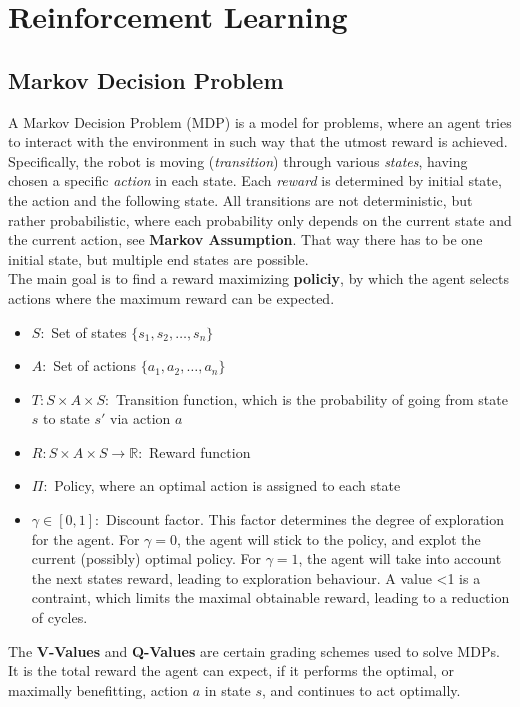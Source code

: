 \documentclass[a4paper]{article}
\begin{document}
	\section{Reinforcement Learning}

	\subsection{Markov Decision Problem}
	A Markov Decision Problem (MDP) is a model for problems, where an agent tries to interact with the environment in such way that the utmost reward is achieved. Specifically, the robot is moving (\textit{transition}) through various \textit{states}, having chosen a specific \textit{action} in each state. Each \textit{reward} is determined by initial state, the action and the following state. 
	All transitions are not deterministic, but rather probabilistic, where each probability only depends on the current state and the current action, see \textbf{Markov Assumption}. That way there has to be one initial state, but multiple end states are possible.\\
	The main goal is to find a reward maximizing \textbf{policiy}, by which the agent selects actions where the maximum reward can be expected.\\
	\begin{itemize}
		\item $S:$ Set of states $\{s_1,s_2,\dots, s_n\}$
		\item $A:$ Set of actions $\{a_1,a_2,\dots, a_n\}$ 
		\item $T: S\times A \times S: $ Transition function, which is the probability of going from state $s$ to state $s'$ via action $a$
		\item $R: S\times A \times S \rightarrow \mathbb{R}: $ Reward function
		\item $\Pi:$ Policy, where an optimal action is assigned to each state
		\item $\gamma \in [0,1]:$ Discount factor. This factor determines the degree of exploration for the agent. For $\gamma=0$, the agent will stick to the policy, and explot the current (possibly) optimal policy. For $\gamma=1$, the agent will take into account the next states reward, leading to exploration behaviour. A value <1 is a contraint, which limits the maximal obtainable reward, leading to a reduction of cycles.
	\end{itemize}
	The \textbf{V-Values} and \textbf{Q-Values} are certain grading schemes used to solve MDPs. It is the total reward the agent can expect, if it performs the optimal, or maximally benefitting, action $a$ in state $s$, and continues to act optimally.
\end{document}
